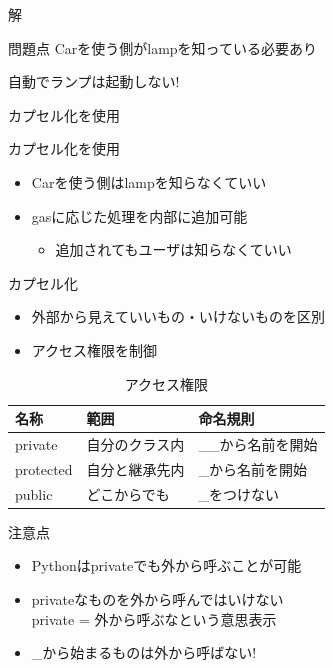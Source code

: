 \documentclass[12pt, xetex, xcolor=pdftex, dvipsnames]{beamer}
\begin{document}
\begin{frame}[fragile]{解}
    
    \pause
    \begin{block}{問題点}
        Carを使う側がlampを知っている必要あり

        \alert{自動でランプは起動しない!}
    \end{block}
\end{frame}
\begin{frame}[fragile]{カプセル化を使用}
    
\end{frame}
\begin{frame}{カプセル化を使用}
    \begin{itemize}
        \item Carを使う側はlampを知らなくていい
        \item gasに応じた処理を内部に追加可能
        \begin{itemize}
            \item 追加されてもユーザは知らなくていい
        \end{itemize}
    \end{itemize}
\end{frame}
\begin{frame}{カプセル化}
    \begin{itemize}
        \item 外部から見えていいもの・いけないものを区別
        \item アクセス権限を制御
    \end{itemize}
    \begin{table}
        \centering
        \caption{アクセス権限}
        \begin{tabular}{lll}
            \hline
            名称 & 範囲 & 命名規則\footnotemark \\\hline
            private & 自分のクラス内 & \_\_から名前を開始 \\\hline
            protected & 自分と継承先内 & \_から名前を開始 \\\hline
            public & どこからでも & \_をつけない \\\hline
        \end{tabular}
    \end{table}
\end{frame}
\begin{frame}{注意点}
    \begin{itemize}
        \item Pythonはprivateでも外から呼ぶことが可能
        \item privateなものを外から呼んではいけない\\
            \alert{private = 外から呼ぶなという意思表示}
        \item \_から始まるものは外から呼ばない!
    \end{itemize}
\end{frame}
\end{document}
